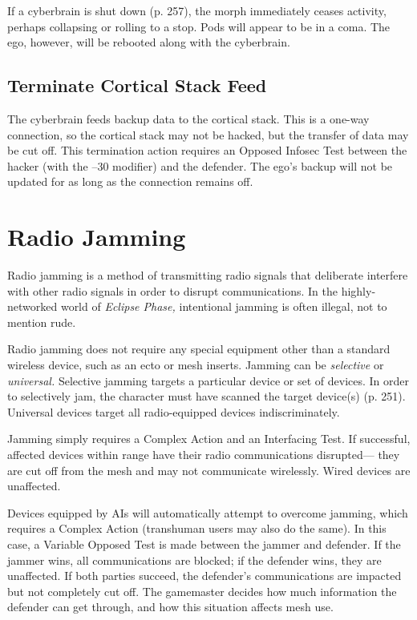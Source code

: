 If a cyberbrain is shut down (p. 257), the morph immediately
ceases activity, perhaps collapsing or rolling
to a stop. Pods will appear to be in a coma. The ego, 
however, will be rebooted along with the cyberbrain.

\subsection{Terminate Cortical Stack Feed}

The cyberbrain feeds backup data to the cortical stack. 
This is a one-way connection, so the cortical stack may 
not be hacked, but the transfer of data may be cut off. 
This termination action requires an Opposed Infosec 
Test between the hacker (with the –30 modifier) and 
the defender. The ego's backup will not be updated for 
as long as the connection remains off.

\section{Radio Jamming}

Radio jamming is a method of transmitting radio 
signals that deliberate interfere with other radio 
signals in order to disrupt communications. In the 
highly-networked world of \textit{Eclipse Phase,} intentional 
jamming is often illegal, not to mention rude.

Radio jamming does not require any special equipment
other than a standard wireless device, such as
an ecto or mesh inserts. Jamming can be \textit{selective }
or \textit{universal.} Selective jamming targets a particular 
device or set of devices. In order to selectively jam, 
the character must have scanned the target device(s) 
(p. 251). Universal devices target all radio-equipped 
devices indiscriminately.

Jamming simply requires a Complex Action and an 
Interfacing Test. If successful, affected devices within 
range have their radio communications disrupted—
they are cut off from the mesh and may not communicate
wirelessly. Wired devices are unaffected.

Devices equipped by AIs will automatically attempt 
to overcome jamming, which requires a Complex 
Action (transhuman users may also do the same). In 
this case, a Variable Opposed Test is made between 
the jammer and defender. If the jammer wins, all communications
are blocked; if the defender wins, they
are unaffected. If both parties succeed, the defender's 
communications are impacted but not completely cut 
off. The gamemaster decides how much information 
the defender can get through, and how this situation 
affects mesh use.

